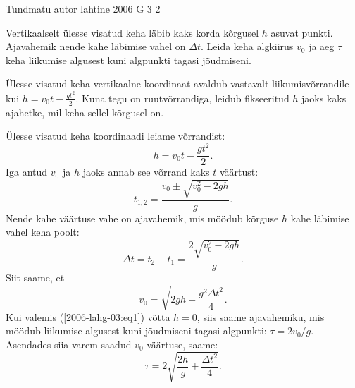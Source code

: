 {Tundmatu autor} %
{lahtine} %
{2006} %
{G 3} %
{2} %
{
\ifStatement
Vertikaalselt ülesse visatud keha läbib kaks korda kõrgusel $h$ asuvat punkti. Ajavahemik nende kahe läbimise vahel on $\Delta t$. Leida keha algkiirus $v_0$ ja aeg $\tau$ keha liikumise algusest kuni algpunkti tagasi jõudmiseni.
\fi


\ifHint
Ülesse visatud keha vertikaalne koordinaat avaldub vastavalt liikumisvõrrandile kui $h = v_0t - \frac{gt^2}{2}$. Kuna tegu on ruutvõrrandiga, leidub fikseeritud $h$ jaoks kaks ajahetke, mil keha sellel kõrgusel on.
\fi


\ifSolution
Ülesse visatud keha koordinaadi leiame võrrandist: 
\[
h = v_0t - \frac{gt^2}{2}.
\]
Iga antud $v_0$ ja $h$ jaoks annab see võrrand kaks $t$ väärtust:
\[
t_{1,2}=\frac{v_{0} \pm \sqrt{v_{0}^{2}-2 g h}}{g}.
\]
Nende kahe väärtuse vahe on ajavahemik, mis möödub kõrguse $h$ kahe läbimise vahel keha poolt:
\begin{equation} \label{2006-lahg-03:eq1}
\Delta t=t_{2}-t_{1}=\frac{2 \sqrt{v_{0}^{2}-2 g h}}{g}.
\end{equation}
Siit saame, et
\[
v_{0}=\sqrt{2 g h+\frac{g^{2} \Delta t^{2}}{4}}.
\]
Kui valemis (\ref{2006-lahg-03:eq1}) võtta $h = 0$, siis saame ajavahemiku, mis möödub liikumise algusest kuni jõudmiseni tagasi algpunkti: $\tau = 2v_0/g$. Asendades siia varem saadud $v_0$ väärtuse, saame:
\[
\tau=2 \sqrt{\frac{2 h}{g}+\frac{\Delta t^{2}}{4}}.
\]
\fi
}